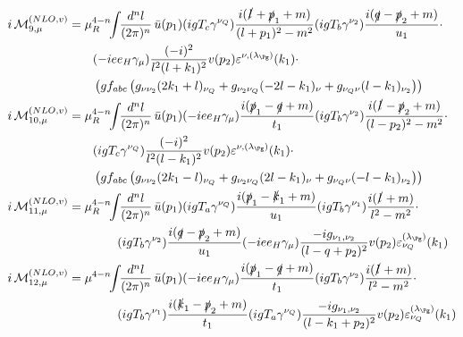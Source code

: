 \begin{align}
i\Md^{(NLO,v)}_{9,\mu} &=\mu_R^{4-n}\!\!\int\!\!\frac{d^nl}{(2\pi)^n}\,\bar u(p_1)(igT_c\gamma^{\nu_Q})\frac{i(\slashed{l}+\slashed{p}_1+m)}{(l+p_1)^2-m^2}(igT_b\gamma^{\nu_2})\frac{i(\slashed{q}-\slashed{p}_2+m)}{u_1}\cdot\nonumber\\
 &\hspace{20pt}(-i e e_H \gamma_\mu)\frac{(-i)^2}{l^2(l+k_1)^2}v(p_2)\varepsilon^{\nu,(\lambda_{\Pg})}(k_1)\cdot\nonumber\\
 &\hspace{20pt}\left(gf_{abc}\left(g_{\nu\nu_2}(2k_1+l)_{\nu_Q}+g_{\nu_2\nu_Q}(-2l-k_1)_{\nu}+g_{\nu_Q\nu}(l-k_1)_{\nu_2}\right)\right)\\
i\Md^{(NLO,v)}_{10,\mu} &=\mu_R^{4-n}\!\!\int\!\!\frac{d^nl}{(2\pi)^n}\,\bar u(p_1)(-i e e_H \gamma_\mu)\frac{i(\slashed{p}_1-\slashed{q}+m)}{t_1}(igT_b\gamma^{\nu_2})\frac{i(\slashed{l}-\slashed{p}_2+m)}{(l-p_2)^2-m^2}\cdot\nonumber\\
 &\hspace{20pt}(igT_c\gamma^{\nu_Q})\frac{(-i)^2}{l^2(l-k_1)^2}v(p_2)\varepsilon^{\nu,(\lambda_{\Pg})}(k_1)\cdot\nonumber\\
 &\hspace{20pt}\left(gf_{abc}\left(g_{\nu\nu_2}(2k_1-l)_{\nu_Q}+g_{\nu_2\nu_Q}(2l-k_1)_{\nu}+g_{\nu_Q\nu}(-l-k_1)_{\nu_2}\right)\right)\\
i\Md^{(NLO,v)}_{11,\mu} &=\mu_R^{4-n}\!\!\int\!\!\frac{d^nl}{(2\pi)^n}\,\bar u(p_1)(igT_a\gamma^{\nu_Q})\frac{i(\slashed{p}_1-\slashed{k}_1+m)}{u_1}(igT_b\gamma^{\nu_1})\frac{i(\slashed{l}+m)}{l^2-m^2}\cdot\nonumber\\
 &\hspace{40pt}(igT_b\gamma^{\nu_2})\frac{i(\slashed{q}-\slashed{p}_2+m)}{u_1}(-i e e_H \gamma_\mu)\frac{-ig_{\nu_1,\nu_2}}{(l-q+p_2)^2}v(p_2)\varepsilon^{(\lambda_{\Pg})}_{\nu_Q}(k_1)\\
i\Md^{(NLO,v)}_{12,\mu} &=\mu^{4-n}\!\!\int\!\!\frac{d^nl}{(2\pi)^n}\,\bar u(p_1)(-i e e_H \gamma_\mu)\frac{i(\slashed{p}_1-\slashed{q}+m)}{t_1}(igT_b\gamma^{\nu_2})\frac{i(\slashed{l}+m)}{l^2-m^2}\cdot\nonumber\\
 &\hspace{40pt}(igT_b\gamma^{\nu_1})\frac{i(\slashed{k}_1-\slashed{p}_2+m)}{t_1}(igT_a\gamma^{\nu_Q})\frac{-ig_{\nu_1,\nu_2}}{(l-k_1+p_2)^2}v(p_2)\varepsilon^{(\lambda_{\Pg})}_{\nu_Q}(k_1)
\end{align}

